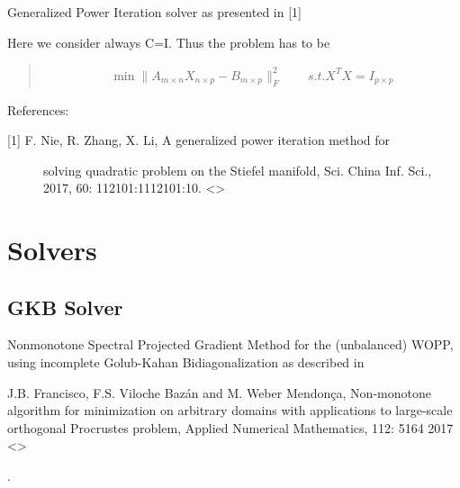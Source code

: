 \documentclass[a4paper,10pt,english]{sphinxmanual}
\begin{document}
\begin{fulllineitems}
\label{\detokenize{skprocrustes:skprocrustes.gpi_solver}}
Generalized Power Iteration solver as presented in {[}1{]}

Here we consider always C=I.
Thus the problem has to be
\begin{quote}
\begin{equation*}
\begin{split}\min \lVert A_{m\times n}X_{n\times p}-B_{m\times p}\rVert_F^2 
\qquad s.t. X^TX=I_{p\times p}    \end{split}
\end{equation*}\end{quote}

References:
\begin{description}
\item[{{[}1{]} F. Nie, R. Zhang, X. Li, A generalized power iteration method for}] \leavevmode
solving quadratic problem on the Stiefel manifold, Sci. China Inf. Sci.,
2017, 60: 112101:1\textendash{}112101:10.
\textless{}\textgreater{}

\end{description}

\end{fulllineitems}



\section{Solvers}
\label{\detokenize{solvers:solvers}}\label{\detokenize{solvers::doc}}

\subsection{GKB Solver}
\label{\detokenize{solvers:gkb-solver}}\label{\detokenize{solvers:gkb}}
Nonmonotone Spectral Projected Gradient Method for the (unbalanced) WOPP, using incomplete Golub-Kahan Bidiagonalization as described in %
\begin{footnote}[2]\sphinxAtStartFootnote
J.B. Francisco, F.S. Viloche Bazán and M. Weber Mendonça, Non-monotone algorithm for minimization on arbitrary domains with applications to large-scale orthogonal Procrustes problem, Applied Numerical Mathematics, 112: 51\textendash{}64 2017 \textless{}\textgreater{}
%
\end{footnote}.
\end{document}
